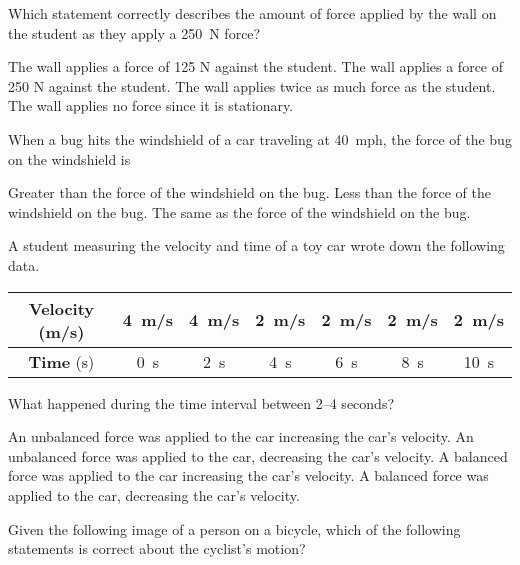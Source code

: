 \documentclass[answers]{exam}
\begin{document}
\begin{questions}
Which statement correctly describes the amount of force applied by the wall on the student as they apply a \SI{250}{N} force?
    
\begin{randomizechoices}[norandomize]
    \choice The wall applies a force of 125 N against the student.
    \correctchoice The wall applies a force of 250 N against the student.
    \choice The wall applies twice as much force as the student.
    \choice The wall applies no force since it is stationary.
\end{randomizechoices}

\question 
When a bug hits the windshield of a car traveling at \SI{40}{mph}, the force of the bug on the windshield is

\begin{randomizechoices}[norandomize]
    \choice Greater than the force of the windshield on the bug.
    \choice Less than the force of the windshield on the bug.
    \correctchoice The same as the force of the windshield on the bug.
\end{randomizechoices}

\question
A student measuring the velocity and time of a toy car wrote down the following data.

\begin{center}
    \begin{tabular}{|c|c|c|c|c|c|c|}
        \hline
        \textbf{Velocity} (m/s) & \SI{4}{m/s} &  \SI{4}{m/s} & \SI{2}{m/s} & \SI{2}{m/s} & \SI{2}{m/s} & \SI{2}{m/s} \\ \hline
        \textbf{Time} (s) & \SI{0}{s} & \SI{2}{s} & \SI{4}{s} & \SI{6}{s} & \SI{8}{s} & \SI{10}{s} \\
        \hline
    \end{tabular}
\end{center}

What happened during the time interval between 2--4 seconds?

\begin{randomizechoices}[norandomize]
    \choice An unbalanced force was applied to the car increasing the car’s velocity.
    \correctchoice An unbalanced force was applied to the car, decreasing the car’s velocity.
    \choice A balanced force was applied to the car increasing the car’s velocity.
    \choice A balanced force was applied to the car, decreasing the car’s velocity.   
\end{randomizechoices}


\question 
Given the following image of a person on a bicycle, which of the following statements is correct about the cyclist’s motion?



\end{questions}
\end{document}
